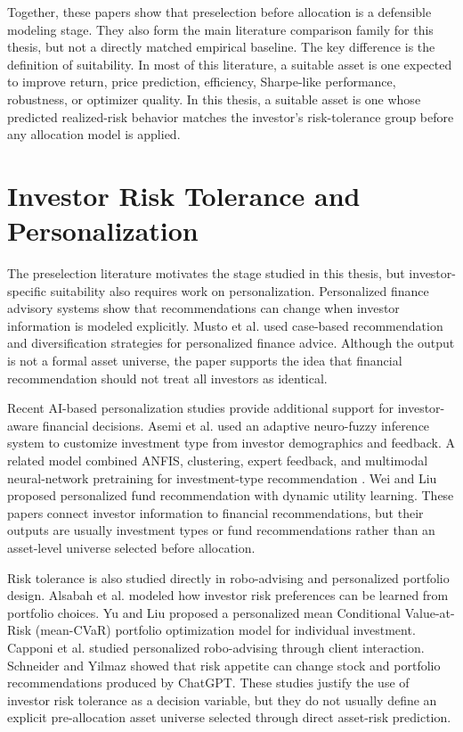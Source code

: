 Together, these papers show that preselection before allocation is a defensible modeling stage. They also form the main literature comparison family for this thesis, but not a directly matched empirical baseline. The key difference is the definition of suitability. In most of this literature, a suitable asset is one expected to improve return, price prediction, efficiency, Sharpe-like performance, robustness, or optimizer quality. In this thesis, a suitable asset is one whose predicted realized-risk behavior matches the investor's risk-tolerance group before any allocation model is applied.

\section[Investor Risk Tolerance and Personalization]{Investor Risk Tolerance and Personalization}

The preselection literature motivates the stage studied in this thesis, but investor-specific suitability also requires work on personalization. Personalized finance advisory systems show that recommendations can change when investor information is modeled explicitly. Musto et al. \cite{musto2015personalized} used case-based recommendation and diversification strategies for personalized finance advice. Although the output is not a formal asset universe, the paper supports the idea that financial recommendation should not treat all investors as identical.

Recent AI-based personalization studies provide additional support for investor-aware financial decisions. Asemi et al. \cite{asemi2023demographics} used an adaptive neuro-fuzzy inference system to customize investment type from investor demographics and feedback. A related model combined ANFIS, clustering, expert feedback, and multimodal neural-network pretraining for investment-type recommendation \cite{asemi2024investmenttype}. Wei and Liu \cite{wei2025fundrecommendation} proposed personalized fund recommendation with dynamic utility learning. These papers connect investor information to financial recommendations, but their outputs are usually investment types or fund recommendations rather than an asset-level universe selected before allocation.

Risk tolerance is also studied directly in robo-advising and personalized portfolio design. Alsabah et al. \cite{alsabah2021roboadvising} modeled how investor risk preferences can be learned from portfolio choices. Yu and Liu \cite{yu2021personalized} proposed a personalized mean Conditional Value-at-Risk (mean-CVaR) portfolio optimization model for individual investment. Capponi et al. \cite{capponi2022personalizedrobo} studied personalized robo-advising through client interaction. Schneider and Yilmaz \cite{schneider2025riskappetite} showed that risk appetite can change stock and portfolio recommendations produced by ChatGPT. These studies justify the use of investor risk tolerance as a decision variable, but they do not usually define an explicit pre-allocation asset universe selected through direct asset-risk prediction.

